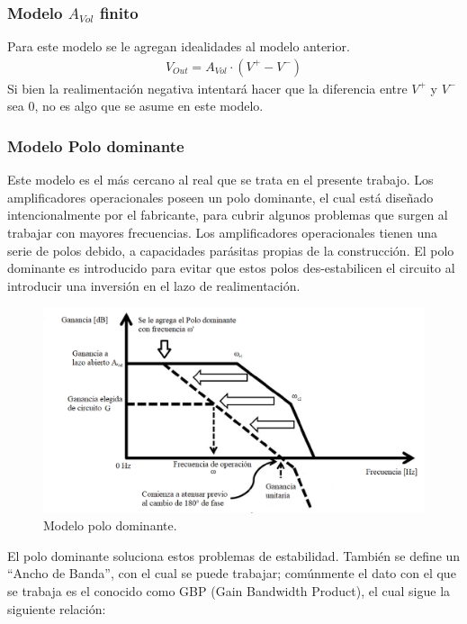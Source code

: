 \subsubsection{Modelo $A_{Vol}$ finito}
Para este modelo se le agregan idealidades al modelo anterior.
\begin{align}V_{Out} = A_{Vol} \cdot (V^+ - V^-)
\label{eq:vout}
\end{align}
Si bien la realimentación negativa intentará hacer que la diferencia entre $V^+$ y $V^-$ sea 0, no es algo que se asume en este modelo.

\subsubsection{Modelo Polo dominante}
Este modelo es el más cercano al real que se trata en el presente trabajo. Los amplificadores operacionales poseen un polo dominante, el cual está diseñado intencionalmente por el fabricante, para cubrir algunos problemas que surgen al trabajar con mayores frecuencias. Los amplificadores operacionales tienen una serie de polos debido, a capacidades parásitas propias de la construcción. El polo dominante es introducido para evitar que estos polos des-estabilicen el circuito al introducir una inversión en el lazo de realimentación.

\begin{figure}[H]	
	\centering
	\includegraphics[width=\textwidth]{Ejercicio1/Imagenes/dompole.png}
	\caption{Modelo polo dominante.}
	\label{fig:dompole}
\end{figure}

El polo dominante soluciona estos problemas de estabilidad. También se define un ``Ancho de Banda'', con el cual se puede trabajar; comúnmente el dato con el que se trabaja es el conocido como GBP (Gain Bandwidth Product), el cual sigue la siguiente relación:

